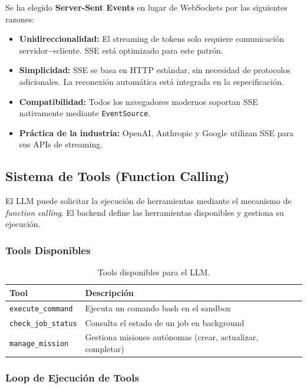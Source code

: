 Se ha elegido \textbf{Server-Sent Events} en lugar de WebSockets por las siguientes razones:

\begin{itemize}
    \item \textbf{Unidireccionalidad:} El streaming de tokens solo requiere comunicación servidor→cliente. SSE está optimizado para este patrón.
    \item \textbf{Simplicidad:} SSE se basa en HTTP estándar, sin necesidad de protocolos adicionales. La reconexión automática está integrada en la especificación.
    \item \textbf{Compatibilidad:} Todos los navegadores modernos soportan SSE nativamente mediante \texttt{EventSource}.
    \item \textbf{Práctica de la industria:} OpenAI, Anthropic y Google utilizan SSE para sus APIs de streaming.
\end{itemize}

\subsection{Sistema de Tools (Function Calling)}

El LLM puede solicitar la ejecución de herramientas mediante el mecanismo de \textit{function calling}. El backend define las herramientas disponibles y gestiona su ejecución.

\subsubsection{Tools Disponibles}

\begin{table}[H]
\centering
\renewcommand{\arraystretch}{1.2}
\begin{tabular}{|l|p{7cm}|}
\hline
\rowcolor[gray]{0.85}
\textbf{Tool} & \textbf{Descripción} \\
\hline
\texttt{execute\_command} & Ejecuta un comando bash en el sandbox \\
\hline
\texttt{check\_job\_status} & Consulta el estado de un job en background \\
\hline
\texttt{manage\_mission} & Gestiona misiones autónomas (crear, actualizar, completar) \\
\hline
\end{tabular}
\caption{Tools disponibles para el LLM.}
\label{tab:tools_llm}
\end{table}

\subsubsection{Loop de Ejecución de Tools}

